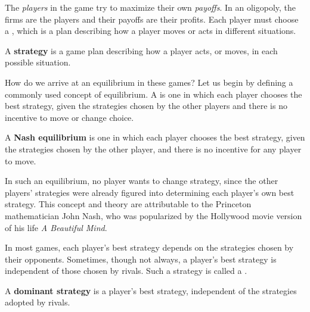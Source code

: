 \newhtmlpage

The \textit{players} in the game try to maximize their own \textit{payoffs}.
In an oligopoly, the firms are the players and their payoffs are their
profits. Each player must choose a , which is a plan
describing how a player moves or acts in different situations.

\begin{DefBox}
	A \textbf{strategy} is a game plan describing how a player acts, or moves, in each possible situation.
\end{DefBox}

How do we arrive at an equilibrium in these games? Let us begin by defining
a commonly used concept of equilibrium. A  is
one in which each player chooses the best strategy, given the strategies
chosen by the other players and there is no incentive to move or change
choice.

\begin{DefBox}
	A \textbf{Nash equilibrium} is one in which each player chooses the best strategy, given the strategies chosen by the other player, and there is no incentive for any player to move.
\end{DefBox}

In such an equilibrium, no player wants to change strategy, since the other
players' strategies were already figured into determining each player's own
best strategy. This concept and theory are attributable to the Princeton
mathematician John Nash, who was popularized by the Hollywood movie version
of his life \textit{A Beautiful Mind}.

In most games, each player's best strategy depends on the strategies chosen
by their opponents. Sometimes, though not always, a player's best strategy
is independent of those chosen by rivals. Such a strategy is called a %
.

\begin{DefBox}
	A \textbf{dominant strategy} is a player's best strategy, independent of the strategies adopted by rivals.
\end{DefBox}

\newhtmlpage

